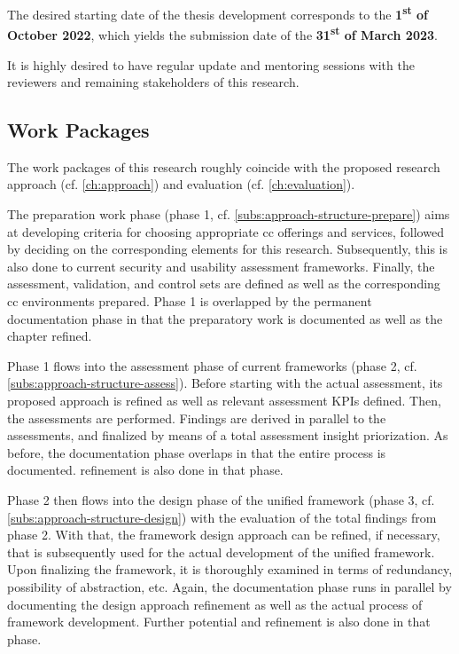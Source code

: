	The desired starting date of the thesis development corresponds to the \textbf{1\textsuperscript{st} of October 2022}, which yields the submission date of the \textbf{31\textsuperscript{st} of March 2023}.
	
	It is highly desired to have regular update and mentoring sessions with the reviewers and remaining stakeholders of this research.
	
	\subsection{Work Packages}
	The work packages of this research roughly coincide with the proposed research approach (cf. \autoref{ch:approach}) and evaluation (cf. \autoref{ch:evaluation}).
	
	The preparation work phase (phase 1, cf. \autoref{subs:approach-structure-prepare}) aims at developing criteria for choosing appropriate \ac{cc} offerings and services, followed by deciding on the corresponding elements for this research. Subsequently, this is also done to current security and usability assessment frameworks. Finally, the assessment, validation, and control sets are defined as well as the corresponding \ac{cc} environments prepared. Phase 1 is overlapped by the permanent documentation phase in that the preparatory work is documented as well as the  chapter refined.
	
	Phase 1 flows into the assessment phase of current frameworks (phase 2, cf. \autoref{subs:approach-structure-assess}). Before starting with the actual assessment, its proposed approach is refined as well as relevant assessment KPIs defined. Then, the assessments are performed. Findings are derived in parallel to the assessments, and finalized by means of a total assessment insight priorization. As before, the documentation phase overlaps in that the entire process is documented.  refinement is also done in that phase.
	
	Phase 2 then flows into the design phase of the unified framework (phase 3, cf. \autoref{subs:approach-structure-design}) with the evaluation of the total findings from phase 2. With that, the framework design approach can be refined, if necessary, that is subsequently used for the actual development of the unified framework. Upon finalizing the framework, it is thoroughly examined in terms of redundancy, possibility of abstraction, etc. Again, the documentation phase runs in parallel by documenting the design approach refinement as well as the actual process of framework development. Further potential  and  refinement is also done in that phase.
	
